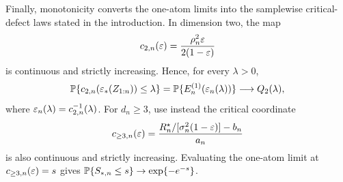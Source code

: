 Finally, monotonicity converts the one-atom limits into the samplewise
critical-defect laws stated in the introduction.  In dimension two, the map
\[
 c_{2,n}(\varepsilon)=\frac{\rho_n^2\varepsilon}{2(1-\varepsilon)}
\]
is continuous and strictly increasing. Hence, for every \(\lambda>0\),
\[
 \mathbb P\{c_{2,n}(\varepsilon_*(Z_{1:n}))\le\lambda\}
 =\mathbb P\{E_n^{(1)}(\varepsilon_n(\lambda))\}
 \longrightarrow Q_2(\lambda),
\]
where \(\varepsilon_n(\lambda)=c_{2,n}^{-1}(\lambda)\). For \(d_n\ge3\), use
instead the critical coordinate
\[
 c_{\ge3,n}(\varepsilon)
 =\frac{R_n^\star/[\sigma_n^2(1-\varepsilon)]-b_n}{a_n}
\]
is also continuous and strictly increasing.  Evaluating the one-atom limit
at \(c_{\ge3,n}(\varepsilon)=s\) gives
\(\mathbb P\{S_{*,n}\le s\}\to\exp\{-e^{-s}\}\).
